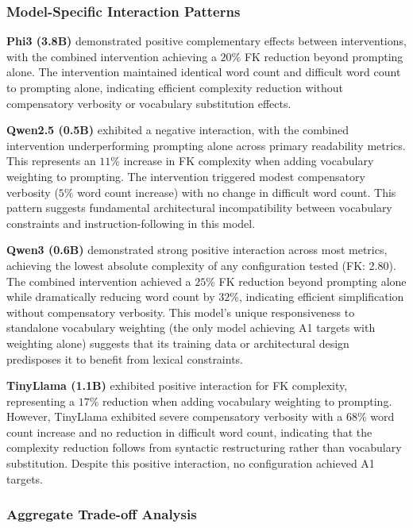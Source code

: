 \documentclass[10pt, a4paper]{article}
\begin{document}
\subsubsection{Model-Specific Interaction Patterns}


\textbf{Phi3 (3.8B)} demonstrated positive complementary effects between interventions, with the combined intervention achieving a $20\%$ FK reduction beyond prompting alone. The intervention maintained identical word count and difficult word count to prompting alone, indicating efficient complexity reduction without compensatory verbosity or vocabulary substitution effects.

\textbf{Qwen2.5 (0.5B)} exhibited a negative interaction, with the combined intervention underperforming prompting alone across primary readability metrics. This represents an $11\%$ increase in FK complexity when adding vocabulary weighting to prompting. The intervention triggered modest compensatory verbosity ($5\%$ word count increase) with no change in difficult word count. This pattern suggests fundamental architectural incompatibility between vocabulary constraints and instruction-following in this model.

\textbf{Qwen3 (0.6B)} demonstrated strong positive interaction across most metrics, achieving the lowest absolute complexity of any configuration tested (FK: 2.80). The combined intervention achieved a $25\%$ FK reduction beyond prompting alone while dramatically reducing word count by $32\%$, indicating efficient simplification without compensatory verbosity. This model's unique responsiveness to standalone vocabulary weighting (the only model achieving A1 targets with weighting alone) suggests that its training data or architectural design predisposes it to benefit from lexical constraints.

\textbf{TinyLlama (1.1B)} exhibited positive interaction for FK complexity, representing a $17\%$ reduction when adding vocabulary weighting to prompting. However, TinyLlama exhibited severe compensatory verbosity with a $68\%$ word count increase and no reduction in difficult word count, indicating that the complexity reduction follows from syntactic restructuring rather than vocabulary substitution. Despite this positive interaction, no configuration achieved A1 targets.

\subsubsection{Aggregate Trade-off Analysis}
\end{document}
